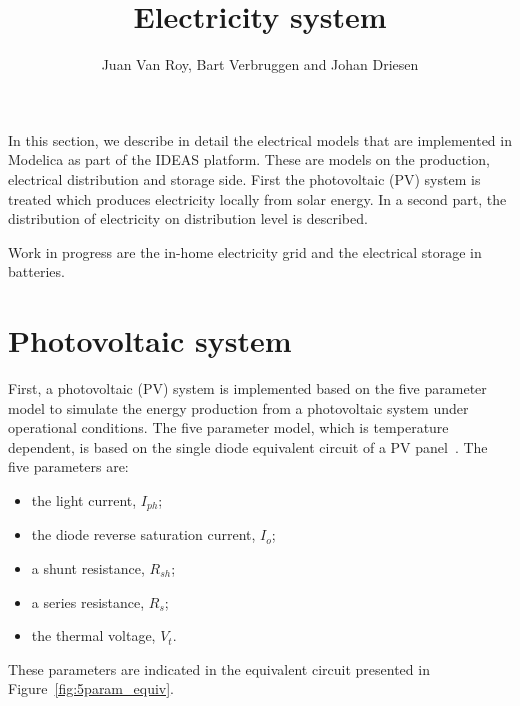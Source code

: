 
\title{Electricity system}
\author{Juan Van Roy, Bart Verbruggen and Johan Driesen}
\maketitle


\vspace{\baselineskip}

In this section, we describe in detail the electrical models that are implemented in Modelica as part of the IDEAS platform. These are models on the production, electrical distribution and storage side. First the photovoltaic (PV) system is treated which produces electricity locally from solar energy. In a second part, the distribution of electricity on distribution level is described.

Work in progress are the in-home electricity grid and the electrical storage in batteries.

\section{Photovoltaic system}
First, a photovoltaic (PV) system is implemented based on the five parameter model to simulate the energy production from a photovoltaic system under operational conditions. The five parameter model, which is temperature dependent, is based on the single diode equivalent circuit of a PV panel~\cite{desoto,sera}. The five parameters are:
\begin{itemize}
\item the light current, $I_{ph}$;
\item the diode reverse saturation current, $I_{o}$;
\item a shunt resistance, $R_{sh}$;
\item a series resistance, $R_{s}$;
\item the thermal voltage, $V_{t}$.
\end{itemize} 
These parameters are indicated in the equivalent circuit presented in Figure~\ref{fig:5param_equiv}.

